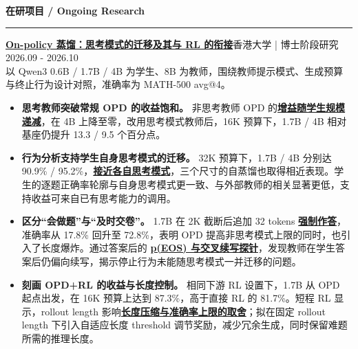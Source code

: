 \documentclass[UTF8,fontset=fandol,11pt,a4paper]{ctexart}
\newenvironment{rSection}[1]{
  \Needspace{7\baselineskip}\medskip
  \textbf{#1}\smallskip\hrule\smallskip
}{\par}
\begin{document}
\begin{rSection}{在研项目 / Ongoing Research}
\begingroup
\fontsize{11}{16}\selectfont
\textbf{\href{https://rummyyang.github.io/research/opd/opd_deck.html\#1}{\textcolor{researchtitle}{On-policy 蒸馏：思考模式的迁移及其与 RL 的衔接}}}\hspace{1.6em}香港大学 | 博士阶段研究\hfill 2026.09 - 2026.10\\[2pt]
以 Qwen3 0.6B / 1.7B / 4B 为学生、8B 为教师，围绕教师提示模式、生成预算与终止行为设计对照，准确率为 MATH-500 avg@4。
\begin{itemize}[itemsep=4pt,topsep=5pt]
\item \textbf{思考教师突破常规 OPD 的收益饱和。} 非思考教师 OPD 的\textbf{\href{https://rummyyang.github.io/research/opd/opd_deck.html\#7}{\textcolor{researchblue}{增益随学生规模递减}}}，在 4B 上降至零，改用思考模式教师后，16K 预算下，1.7B / 4B 相对基座仍提升 13.3 / 9.5 个百分点。
\item \textbf{行为分析支持学生自身思考模式的迁移。} 32K 预算下，1.7B / 4B 分别达 90.9\% / 95.2\%，\textbf{\href{https://rummyyang.github.io/research/opd/opd_deck.html\#2}{\textcolor{researchblue}{接近各自思考模式}}}，三个尺寸的自蒸馏也取得相近表现。学生的逐题正确率轮廓与自身思考模式更一致、与外部教师的相关显著更低，支持收益可来自已有思考能力的调用。
\item \textbf{区分“会做题”与“及时交卷”。} 1.7B 在 2K 截断后追加 32 tokens \textbf{\href{https://rummyyang.github.io/research/opd/opd_deck.html\#3}{\textcolor{researchblue}{强制作答}}}，准确率从 17.8\% 回升至 72.8\%，表明 OPD 提高非思考模式上限的同时，也引入了长度爆炸。通过答案后的 \textbf{\href{https://rummyyang.github.io/research/opd/opd_deck.html\#6}{\textcolor{researchblue}{p(EOS) 与交叉续写探针}}}，发现教师在学生答案后仍偏向续写，揭示停止行为未能随思考模式一并迁移的问题。
\item \textbf{刻画 OPD+RL 的收益与长度控制。} 相同下游 RL 设置下，1.7B 从 OPD 起点出发，在 16K 预算上达到 87.3\%，高于直接 RL 的 81.7\%。短程 RL 显示，rollout length 影响\textbf{\href{https://rummyyang.github.io/research/opd/opd_deck.html\#5}{\textcolor{researchblue}{长度压缩与准确率上限的取舍}}}；拟在固定 rollout length 下引入自适应长度 threshold 调节奖励，减少冗余生成，同时保留难题所需的推理长度。
\end{itemize}
\endgroup
\end{rSection}
\newpage
\end{document}
